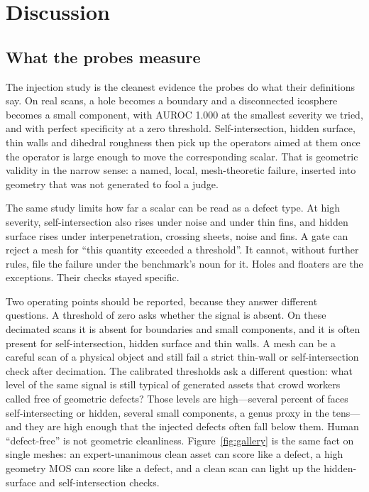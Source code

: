 \section{Discussion}
\label{sec:disc}

\subsection{What the probes measure}
The injection study is the cleanest evidence the probes do what their definitions say.
On real scans, a hole becomes a boundary and a disconnected icosphere becomes a small component, with AUROC 1.000 at the smallest severity we tried, and with perfect specificity at a zero threshold.
Self-intersection, hidden surface, thin walls and dihedral roughness then pick up the operators aimed at them once the operator is large enough to move the corresponding scalar.
That is geometric validity in the narrow sense: a named, local, mesh-theoretic failure, inserted into geometry that was not generated to fool a judge.

The same study limits how far a scalar can be read as a defect type.
At high severity, self-intersection also rises under noise and under thin fins, and hidden surface rises under interpenetration, crossing sheets, noise and fins.
A gate can reject a mesh for ``this quantity exceeded a threshold''.
It cannot, without further rules, file the failure under the benchmark's noun for it.
Holes and floaters are the exceptions.
Their checks stayed specific.

Two operating points should be reported, because they answer different questions.
A threshold of zero asks whether the signal is absent.
On these decimated scans it is absent for boundaries and small components, and it is often present for self-intersection, hidden surface and thin walls.
A mesh can be a careful scan of a physical object and still fail a strict thin-wall or self-intersection check after decimation.
The calibrated thresholds ask a different question: what level of the same signal is still typical of generated assets that crowd workers called free of geometric defects?
Those levels are high---several percent of faces self-intersecting or hidden, several small components, a genus proxy in the tens---and they are high enough that the injected defects often fall below them.
Human ``defect-free'' is not geometric cleanliness.
Figure~\ref{fig:gallery} is the same fact on single meshes: an expert-unanimous clean asset can score like a defect, a high geometry MOS can score like a defect, and a clean scan can light up the hidden-surface and self-intersection checks.

